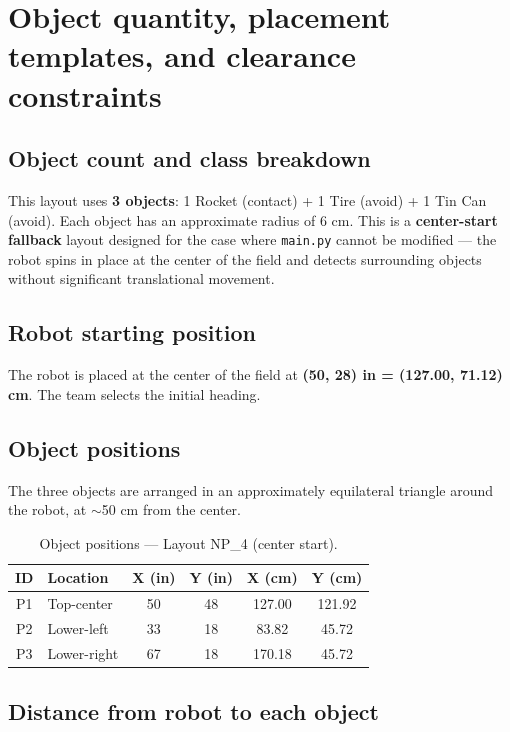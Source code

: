 \documentclass[a4]{article}
\begin{document}
\section*{Object quantity, placement templates, and clearance constraints}
\subsection*{Object count and class breakdown}
This layout uses \textbf{3 objects}: 1 Rocket (contact) + 1 Tire (avoid) + 1 Tin Can (avoid). Each object has an approximate radius of 6 cm. This is a \textbf{center-start fallback} layout designed for the case where \texttt{main.py} cannot be modified --- the robot spins in place at the center of the field and detects surrounding objects without significant translational movement.

\subsection*{Robot starting position}

The robot is placed at the center of the field at \textbf{(50, 28) in = (127.00, 71.12) cm}. The team selects the initial heading.

\subsection*{Object positions}

The three objects are arranged in an approximately equilateral triangle around the robot, at $\sim$50 cm from the center.

\begin{table}[H]
\centering
\begin{tabular}{clcccc}
\toprule
\textbf{ID} & \textbf{Location} & \textbf{X (in)} & \textbf{Y (in)} & \textbf{X (cm)} & \textbf{Y (cm)} \\
\midrule
P1 & Top-center & 50 & 48 & 127.00 & 121.92 \\
P2 & Lower-left & 33 & 18 & 83.82 & 45.72 \\
P3 & Lower-right & 67 & 18 & 170.18 & 45.72 \\
\bottomrule
\end{tabular}
\caption{Object positions --- Layout NP\_4 (center start).}
\end{table}

\subsection*{Distance from robot to each object}
\end{document}
